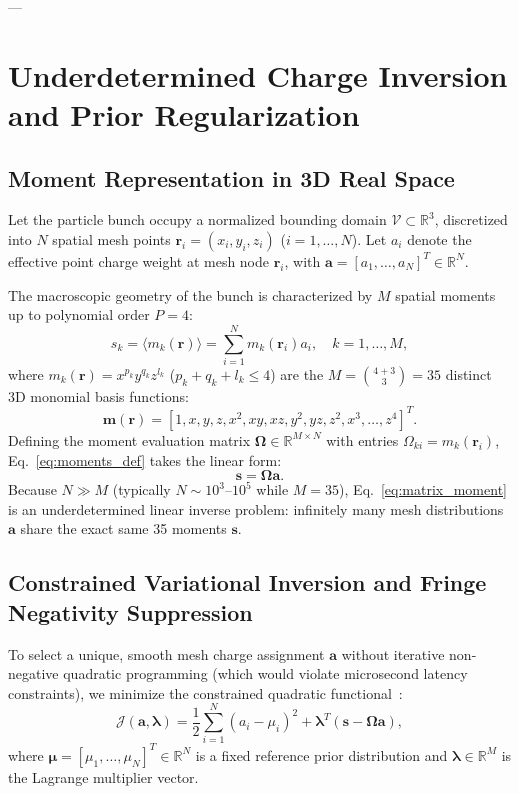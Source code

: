 \documentclass[11pt,a4paper]{article}
\newcommand{\bOmega}{\mathbf{\Omega}}
\begin{document}
---

\section{Underdetermined Charge Inversion and Prior Regularization}

\subsection{Moment Representation in 3D Real Space}
Let the particle bunch occupy a normalized bounding domain $\mathcal{V} \subset \mathbb{R}^3$, discretized into $N$ spatial mesh points $\bm{r}_i = (x_i, y_i, z_i)$ ($i = 1, \dots, N$). Let $a_i$ denote the effective point charge weight at mesh node $\bm{r}_i$, with $\bm{a} = [a_1, \dots, a_N]^T \in \mathbb{R}^N$.

The macroscopic geometry of the bunch is characterized by $M$ spatial moments up to polynomial order $P=4$:
\begin{equation}
    s_k = \langle m_k(\bm{r}) \rangle = \sum_{i=1}^N m_k(\bm{r}_i) a_i, \quad k = 1, \dots, M,
    \label{eq:moments_def}
\end{equation}
where $m_k(\bm{r}) = x^{p_k} y^{q_k} z^{l_k}$ ($p_k + q_k + l_k \le 4$) are the $M = \binom{4+3}{3} = 35$ distinct 3D monomial basis functions:
\begin{equation}
    \bm{m}(\bm{r}) = \left[ 1, x, y, z, x^2, xy, xz, y^2, yz, z^2, x^3, \dots, z^4 \right]^T.
\end{equation}
Defining the moment evaluation matrix $\bOmega \in \mathbb{R}^{M \times N}$ with entries $\Omega_{ki} = m_k(\bm{r}_i)$, Eq.~\eqref{eq:moments_def} takes the linear form:
\begin{equation}
    \bm{s} = \bOmega \bm{a}.
    \label{eq:matrix_moment}
\end{equation}
Because $N \gg M$ (typically $N \sim 10^3\text{--}10^5$ while $M = 35$), Eq.~\eqref{eq:matrix_moment} is an underdetermined linear inverse problem: infinitely many mesh distributions $\bm{a}$ share the exact same 35 moments $\bm{s}$.

\subsection{Constrained Variational Inversion and Fringe Negativity Suppression}
To select a unique, smooth mesh charge assignment $\bm{a}$ without iterative non-negative quadratic programming (which would violate microsecond latency constraints), we minimize the constrained quadratic functional~\cite{ahn1994preliminary}:
\begin{equation}
    \mathcal{J}(\bm{a}, \bm{\lambda}) = \frac{1}{2} \sum_{i=1}^N (a_i - \mu_i)^2 + \bm{\lambda}^T (\bm{s} - \bOmega \bm{a}),
    \label{eq:lagrangian_func}
\end{equation}
where $\bm{\mu} = [\mu_1, \dots, \mu_N]^T \in \mathbb{R}^N$ is a fixed reference prior distribution and $\bm{\lambda} \in \mathbb{R}^M$ is the Lagrange multiplier vector.
\end{document}
